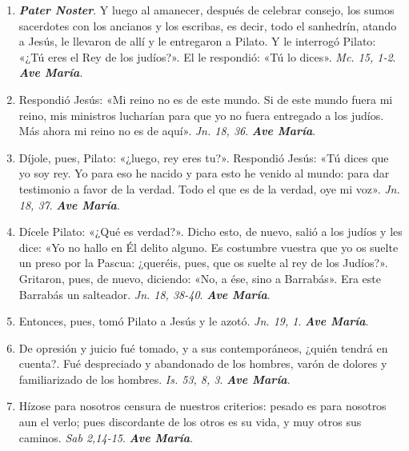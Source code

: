 \documentclass[../../devocionario.tex]{subfiles}
\begin{document}
    \begin{enumerate}
    
        \item \textbf{\emph{Pater Noster}}. Y luego al amanecer, después de celebrar consejo, los sumos sacerdotes con los ancianos y los escribas, 
            es decir, todo el sanhedrín, atando a Jesús, le llevaron de allí y le entregaron a Pilato. 
            Y le interrogó Pilato: «¿Tú eres el Rey de los judíos?». El le respondió: «Tú lo dices». \emph{Mc. 15, 1-2}. \textbf{\emph{Ave María}}.

        \item Respondió Jesús: «Mi reino no es de este mundo. Si de este mundo fuera mi reino, mis ministros lucharían para 
            que yo no fuera entregado a los judíos. Más ahora mi reino no es de aquí». \emph{Jn. 18, 36}. \textbf{\emph{Ave María}}.

        \item Díjole, pues, Pilato: «¿luego, rey eres tu?». Respondió Jesús: «Tú dices que yo soy rey. Yo para eso he nacido y 
            para esto he venido al mundo: para dar testimonio a favor de la verdad. 
            Todo el que es de la verdad, oye mi voz». \emph{Jn. 18, 37}. \textbf{\emph{Ave María}}.

        \item Dícele Pilato: «¿Qué es verdad?». Dicho esto, de nuevo, salió a los judíos y les dice: 
            «Yo no hallo en Él delito alguno. Es costumbre vuestra que yo os suelte un preso por la Pascua: ¿queréis, pues, 
            que os suelte al rey de los Judíos?». Gritaron, pues, de nuevo, diciendo: «No, a ése, sino a Barrabás». 
            Era este Barrabás un salteador. \emph{Jn. 18, 38-40}. \textbf{\emph{Ave María}}.

        \item Entonces, pues, tomó Pilato a Jesús y le azotó. \emph{Jn. 19, 1}. \textbf{\emph{Ave María}}.

        \item De opresión y juicio fué tomado, y a sus contemporáneos, ¿quién tendrá en cuenta?. Fué despreciado y abandonado de los hombres, 
            varón de dolores y familiarizado de los hombres. \emph{Is. 53, 8, 3}. \textbf{\emph{Ave María}}.

        \item Hízose para nosotros censura de nuestros criterios: pesado es para nosotros aun el verlo; 
            pues discordante de los otros es su vida, y muy otros sus caminos. \emph{Sab 2,14-15}. \textbf{\emph{Ave María}}.


\end{enumerate}
\end{document}
